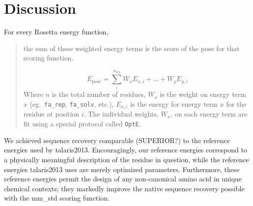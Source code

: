 \section{Discussion}
For every Rosetta energy function,
\begin{quote}
the sum of these weighted energy terms is the score of the pose for that scoring function. 

\begin{equation}
E_{\text{pose}} = \sum_{i}^{n_{\text{res}}} W_{x} E_{x,i} + ... + W_{y} E_{y,i}
\end{equation}
Where $n$ is the total number of residues, $W_{x}$ is the weight on energy term $x$ (eg.\ \texttt{fa\_rep}, \texttt{fa\_solv}, etc.), $E_{x,i}$ is the energy for energy term $x$ for the residue at position $i$. 
The individual weights, $W_x$, on each energy term are fit using a special protocol called \texttt{OptE}.
\end{quote}
We achieved sequence recovery comparable (SUPERIOR?) to the reference energies used by talaris2013.
Encouragingly, our reference energies correspond to a physically meaningful description of the residue in question, while the reference energies talaris2013 uses are merely optimized parameters.
Furthermore, these reference energies permit the design of any non-canonical amino acid in unique chemical contexts; they markedly improve the native sequence recovery possible with the mm\_std scoring function.